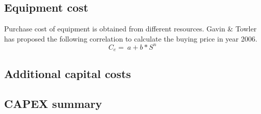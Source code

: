 \subsection{Equipment cost}
Purchase cost of equipment is obtained from different resources. Gavin & Towler has proposed the following correlation to calculate the buying price in year 2006.
\begin{equation}
    C_{e}=\ a+b*S^n
\end{equation}





\subsection{Additional capital costs}
\subsection{CAPEX summary}